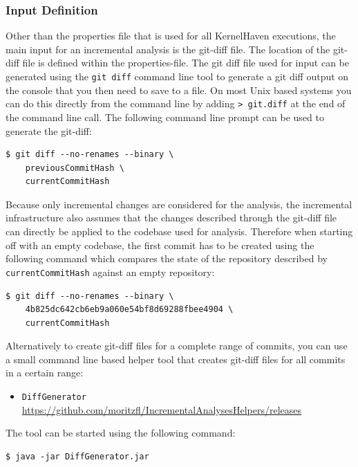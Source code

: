 \documentclass[a4paper]{article}
\begin{document}
\subsubsection{Input Definition}

Other than the properties file that is used for all KernelHaven executions, the main input for an incremental analysis is the git-diff file. The location of the git-diff file is defined within the properties-file. The git diff file used for input can be generated using the \texttt{git diff} command line tool to generate a git diff output on the console that you then need to save to a file. On most Unix based systems you can do this directly from the command line by adding \texttt{> git.diff} at the end of the command line call. The following command line prompt can be used to generate the git-diff:

\begin{lstlisting}
$ git diff --no-renames --binary \ 
    previousCommitHash \ 
    currentCommitHash
\end{lstlisting}

Because only incremental changes are considered for the analysis, the incremental infrastructure also assumes that the changes described through the git-diff file can directly be applied to the codebase used for analysis. Therefore when starting off with an empty codebase, the first commit has to be created using the following command which compares the state of the repository described by \texttt{currentCommitHash} against an empty repository:

\begin{lstlisting}
$ git diff --no-renames --binary \
    4b825dc642cb6eb9a060e54bf8d69288fbee4904 \
    currentCommitHash
\end{lstlisting}

Alternatively to create git-diff files for a complete range of commits, you can use a small command line based helper tool that creates git-diff files for all commits in a certain range:
\begin{itemize}
	\item \texttt{DiffGenerator} \\
	   \url{https://github.com/moritzfl/IncrementalAnalysesHelpers/releases}
\end{itemize}

The tool can be started using the following command:

\begin{lstlisting}
$ java -jar DiffGenerator.jar
\end{lstlisting}
\end{document}
